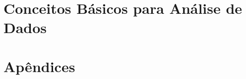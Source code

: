 \documentclass[12pt,a4paper,]{book}
\begin{document}



\tableofcontents
%
%

\part[Conceitos Básicos para Análise de Dados]{Conceitos Básicos para Análise de Dados}

\setcounter{chapter}{0}






%
%
%
%
%
%

%
%

\part{Apêndices}
\appendix 



\end{document}
